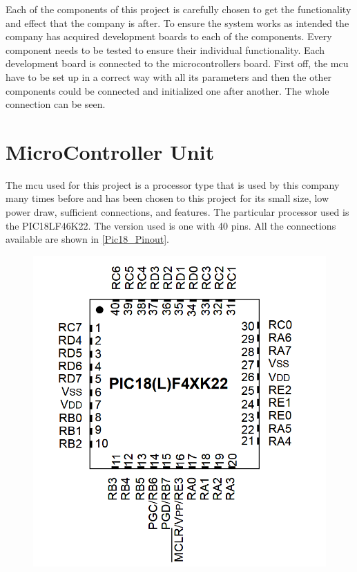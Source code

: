 Each of the components of this project is carefully chosen to get the functionality and effect that the company is after. To ensure the system works as intended the company has acquired development boards to each of the components. Every component needs to be tested to ensure their individual functionality. Each development board is connected to the microcontrollers board. First off, the \gls{mcu} have to be set up in a correct way with all its parameters and then the other components could be connected and initialized one after another. The whole connection can be seen. %




\section{MicroController Unit}
The \gls{mcu} used for this project is a processor type that is used by this company many times before and has been chosen to this project for its small size, low power draw, sufficient connections, and features. The particular processor used is the PIC18LF46K22\cite{pic18}. The version used is one with 40 pins. All the connections available are shown in \autoref{Pic18_Pinout}.

\begin{figure}[H] 
\centering 
\includegraphics[width=.7\linewidth]{Figures/Pic18_pinout} 
\label{Pic18_Pinout} 
\end{figure} 

